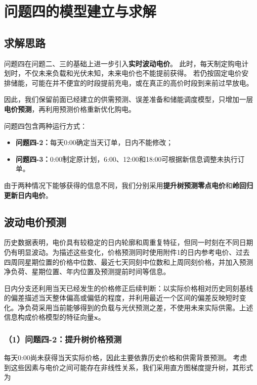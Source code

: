 \section{问题四的模型建立与求解}

\subsection{求解思路}

问题四在问题二、三的基础上进一步引入\textbf{实时波动电价}。
此时，每天制定购电计划时，不仅未来负载和光伏未知，未来电价也不能提前获得。
若仍按固定电价安排储能，可能在并不便宜的时段提前充电，或在真正的高价时段到来前过早放电。

因此，我们保留前面已经建立的供需预测、误差准备和储能调度模型，只增加一层\textbf{电价预测}，再利用预测价格重新优化购电。

问题四包含两种运行方式：

\begin{itemize}
    \item \textbf{问题四-2：}每天0:00确定当天订单，日内不能修改；
    \item \textbf{问题四-3：}0:00制定原计划，6:00、12:00和18:00可根据新信息调整未执行订单。
\end{itemize}

由于两种情况下能够获得的信息不同，我们分别采用\textbf{提升树预测零点电价}和\textbf{岭回归更新日内电价}。


\subsection{波动电价预测}

历史数据表明，电价具有较稳定的日内轮廓和周重复特征，但同一时刻在不同日期仍有明显波动。为描述这些变化，价格预测同时使用附件1的日内参考电价、过去四周同星期位置的价格中位数、最近七天同刻中位数和上周同刻价格，并加入预测净负荷、星期位置、年内位置及预测提前时间等信息。

日内分支还利用当天已经发生的价格修正后续判断：以实际价格相对历史同刻基线的偏差描述当天整体偏高或偏低的程度，并利用最近一个区间的偏差反映短时变化。净负荷采用当前能够得到的负载与光伏预测之差，不使用未来实际供需。上述信息构成价格模型的特征向量$\mathbf{x}$。

\subsubsection*{（1）问题四-2：提升树价格预测}

每天0:00尚未获得当天实际价格，因此主要依靠历史价格和供需背景预测。
考虑到这些因素与电价之间可能存在非线性关系，我们采用直方图梯度提升树，其形式为

